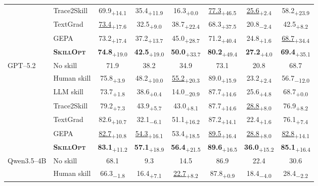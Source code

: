 \documentclass{llmxive}
\providecommand{\ourmethod}{\textsc{SkillOpt}\xspace}
\providecommand{\dvalp}[2]{\hphantom{\textsubscript{+#2}}#1\textsubscript{+#2}}
\providecommand{\dvaln}[2]{\hphantom{\textsubscript{$-$#2}}#1\textsubscript{$-$#2}}
\providecommand{\methodcell}[1]{\cellcolor{blue!8}#1}
\begin{document}
\begin{table}[!htbp]
\begin{tabular}{l l c c c c c c}
 & Trace2Skill & \dvalp{69.9}{14.1} & \dvalp{35.4}{11.9} & \dvalp{16.3}{0.0} & \dvalp{\underline{77.3}}{46.5} & \dvalp{\underline{25.6}}{2.4} & \dvalp{58.2}{23.9} \\
 & TextGrad & \dvalp{\underline{73.4}}{17.6} & \dvalp{32.5}{9.0} & \dvalp{38.7}{22.4} & \dvalp{68.3}{37.5} & \dvaln{20.8}{2.4} & \dvalp{42.5}{8.2} \\
 & GEPA & \dvalp{73.2}{17.4} & \dvalp{37.2}{13.7} & \dvalp{45.0}{28.7} & \dvalp{71.2}{40.4} & \dvalp{24.8}{1.6} & \dvalp{\underline{68.7}}{34.4} \\
 & \methodcell{\textbf{\ourmethod{}}} & \methodcell{\dvalp{\textbf{74.8}}{19.0}} & \methodcell{\dvalp{\textbf{42.5}}{19.0}} & \methodcell{\dvalp{\textbf{50.0}}{33.7}} & \methodcell{\dvalp{\textbf{80.2}}{49.4}} & \methodcell{\dvalp{\textbf{27.2}}{4.0}} & \methodcell{\dvalp{\textbf{69.4}}{35.1}} \\
\cmidrule(lr){1-8}
\multirow{7}{*}{GPT--5.2} & No skill & 71.9 & 38.2 & 34.9 & 73.1 & 20.8 & 68.7 \\
 & Human skill & \dvalp{75.8}{3.9} & \dvalp{48.2}{10.0} & \dvalp{\underline{55.2}}{20.3} & \dvalp{89.0}{15.9} & \dvalp{23.2}{2.4} & \dvaln{56.7}{12.0} \\
 & LLM skill & \dvalp{73.7}{1.8} & \dvalp{38.6}{0.4} & \dvaln{14.0}{20.9} & \dvalp{87.7}{14.6} & \dvalp{25.6}{4.8} & \dvalp{68.7}{0.0} \\
 & Trace2Skill & \dvalp{79.2}{7.3} & \dvalp{43.9}{5.7} & \dvalp{43.0}{8.1} & \dvalp{87.7}{14.6} & \dvalp{\underline{28.8}}{8.0} & \dvalp{76.9}{8.2} \\
 & TextGrad & \dvalp{82.6}{10.7} & \dvaln{32.1}{6.1} & \dvalp{51.1}{16.2} & \dvalp{87.2}{14.1} & \dvalp{22.4}{1.6} & \dvalp{76.1}{7.4} \\
 & GEPA & \dvalp{\underline{82.7}}{10.8} & \dvalp{\underline{54.3}}{16.1} & \dvalp{53.4}{18.5} & \dvalp{\underline{89.5}}{16.4} & \dvalp{\underline{28.8}}{8.0} & \dvalp{\underline{82.8}}{14.1} \\
 & \methodcell{\textbf{\ourmethod{}}} & \methodcell{\dvalp{\textbf{83.1}}{11.2}} & \methodcell{\dvalp{\textbf{57.1}}{18.9}} & \methodcell{\dvalp{\textbf{56.4}}{21.5}} & \methodcell{\dvalp{\textbf{89.6}}{16.5}} & \methodcell{\dvalp{\textbf{36.0}}{15.2}} & \methodcell{\dvalp{\textbf{85.1}}{16.4}} \\
\cmidrule(lr){1-8}
\multirow{7}{*}{Qwen3.5--4B} & No skill & 68.1 & 9.3 & 14.5 & 86.9 & 22.4 & 30.6 \\
 & Human skill & \dvaln{66.3}{1.8} & \dvalp{16.4}{7.1} & \dvalp{\underline{22.7}}{8.2} & \dvalp{87.8}{0.9} & \dvaln{18.4}{4.0} & \dvaln{28.4}{2.2} \\

\end{tabular}
\end{table}
\end{document}
